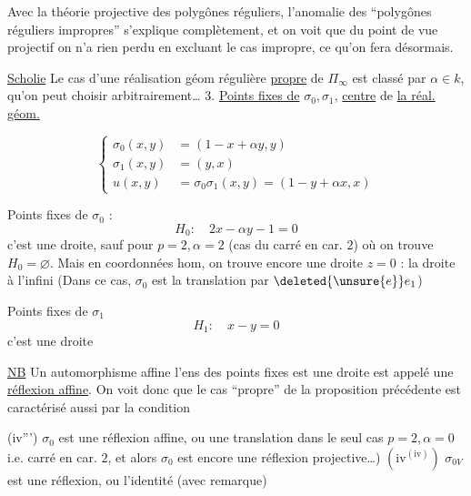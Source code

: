 Avec la théorie projective des polygônes
réguliers, l'anomalie  des ``polygônes
réguliers impropres'' s'explique complètement, et on voit que du point de vue
projectif on n'a rien perdu en excluant
le cas impropre, ce qu'on fera désormais.

\uline{Scholie} Le cas d'une réalisation géom
régulière \uline{propre} de $\Pi_\infty$ est classé par $\alpha\in k$,
qu'on peut choisir arbitrairement\ldots
3. \uline{Points fixes de} $\sigma_0,\sigma_1$, \uline{centre} de \uline{la réal. géom.}

\[ \left\{\begin{aligned}\sigma_0(x,y)&=(1-x+\alpha y,y)\\
\sigma_1(x,y)&=(y,x)\\
u(x,y)&=\sigma_0\sigma_1(x,y)=(1-y+\alpha x,x)\end{aligned}\right. \tag*{(26)} \]


Points fixes de $\sigma_0$ :
\[ H_0:\quad 2x-\alpha y-1=0 \tag*{(27)} \]
c'est une droite,
sauf pour $p=2,\alpha=2$
(cas du carré en car. $2$)
où on trouve $H_0=\varnothing$. Mais
 en coordonnées hom, on
trouve encore une droite
$z=0$ : la droite à l'infini
(Dans ce cas, $\sigma_0$ est la translation par $\deleted{\unsure{e}} e_1$)

Points fixes de $\sigma_1$
\[ H_1:\quad x-y=0 \tag*{(28)} \]
c'est une droite

\uline{NB} Un automorphisme affine   l'ens des
points fixes est une droite est appelé une
\uline{réflexion affine}. On voit donc que le
cas ``propre'' de la proposition précédente est
caractérisé aussi par la condition

(iv''') $\sigma_0$ est une réflexion affine, ou  une
translation   dans le seul cas
$p=2,\alpha=0$ i.e. carré en car. $2$, et alors $\sigma_0$ est
encore une réflexion projective\ldots)
$(\mathrm{iv}^{(\mathrm{iv})})$ $\sigma_{0V}$ est une réflexion, ou l'identité
(avec  remarque)

